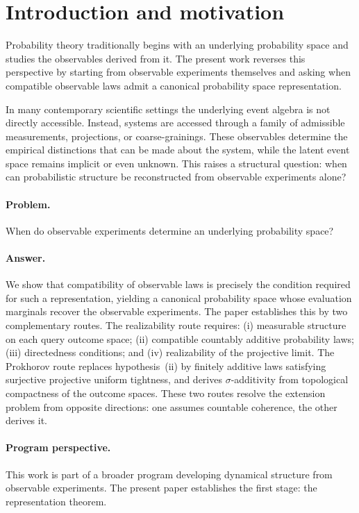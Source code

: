 \section{Introduction and motivation}

Probability theory traditionally begins with an underlying probability
space and studies the observables derived from it.  The present work
reverses this perspective by starting from observable experiments
themselves and asking when compatible observable laws admit a canonical
probability space representation.

In many contemporary scientific settings the underlying event algebra
is not directly accessible. Instead, systems are accessed through a
family of admissible measurements, projections, or coarse-grainings.
These observables determine the empirical distinctions that can be
made about the system, while the latent event space remains implicit
or even unknown. This raises a structural question: when can
probabilistic structure be reconstructed from observable experiments
alone?

\paragraph{Problem.}
When do observable experiments determine an underlying probability
space?

\paragraph{Answer.}
We show that compatibility of observable laws is precisely the
condition required for such a representation, yielding a canonical
probability space whose evaluation marginals recover the observable
experiments.  The paper establishes this by two complementary routes.
The realizability route requires: (i) measurable structure on each
query outcome space; (ii) compatible countably additive probability
laws; (iii) directedness conditions; and (iv) realizability of the
projective limit.  The Prokhorov route replaces hypothesis~(ii) by
finitely additive laws satisfying surjective projective uniform
tightness, and derives $\sigma$-additivity from topological
compactness of the outcome spaces.  These two routes resolve the
extension problem from opposite directions: one assumes countable
coherence, the other derives it.

\paragraph{Program perspective.}
This work is part of a broader program developing dynamical structure
from observable experiments.  The present paper establishes the first
stage: the representation theorem.

